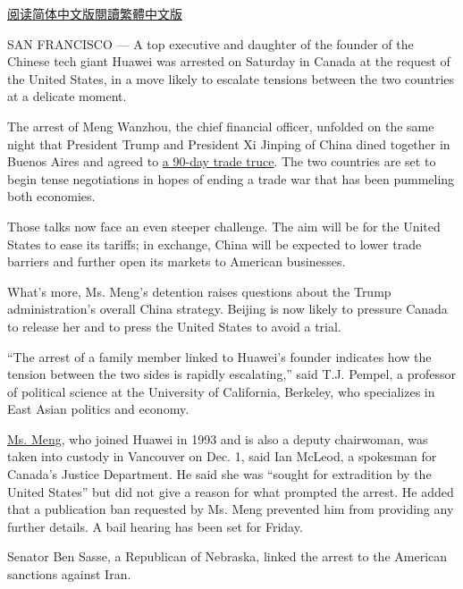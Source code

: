 \href{https://cn.nytimes.com/business/20181206/huawei-cfo-arrest-canada-extradition/}{阅读简体中文版}\href{https://cn.nytimes.com/business/20181206/huawei-cfo-arrest-canada-extradition/zh-hant/}{閱讀繁體中文版}

SAN FRANCISCO --- A top executive and daughter of the founder of the
Chinese tech giant Huawei was arrested on Saturday in Canada at the
request of the United States, in a move likely to escalate tensions
between the two countries at a delicate moment.

The arrest of Meng Wanzhou, the chief financial officer, unfolded on the
same night that President Trump and President Xi Jinping of China dined
together in Buenos Aires and agreed to
\href{https://www.nytimes.com/2018/12/05/us/politics/trump-xi-trade-china.html?action=click\&module=Top\%20Stories\&pgtype=Homepage}{a
90-day trade truce}. The two countries are set to begin tense
negotiations in hopes of ending a trade war that has been pummeling both
economies.

Those talks now face an even steeper challenge. The aim will be for the
United States to ease its tariffs; in exchange, China will be expected
to lower trade barriers and further open its markets to American
businesses.

What's more, Ms. Meng's detention raises questions about the Trump
administration's overall China strategy. Beijing is now likely to
pressure Canada to release her and to press the United States to avoid a
trial.

``The arrest of a family member linked to Huawei's founder indicates how
the tension between the two sides is rapidly escalating,'' said T.J.
Pempel, a professor of political science at the University of
California, Berkeley, who specializes in East Asian politics and
economy.

\href{https://www.huawei.com/us/about-huawei/executives/board-of-directors/meng-wanzhou}{Ms.
Meng}, who joined Huawei in 1993 and is also a deputy chairwoman, was
taken into custody in Vancouver on Dec. 1, said Ian McLeod, a spokesman
for Canada's Justice Department. He said she was ``sought for
extradition by the United States'' but did not give a reason for what
prompted the arrest. He added that a publication ban requested by Ms.
Meng prevented him from providing any further details. A bail hearing
has been set for Friday.

Senator Ben Sasse, a Republican of Nebraska, linked the arrest to the
American sanctions against Iran.

